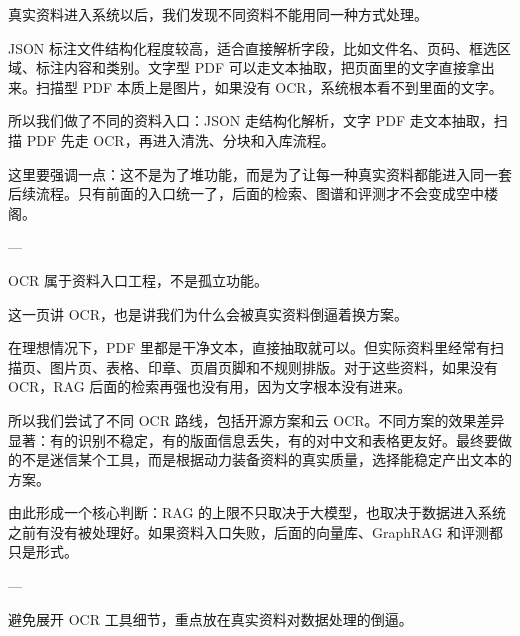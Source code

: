 \documentclass[10pt, a4paper]{ctexart}
\begin{document}
\begin{tcolorbox}[colback=white, colframe=primary!35, title={\textbf{第 7 页：不同资料必须走不同通道}}, beforeafter skip=2.0pt]
\begin{minipage}[t]{0.72\textwidth}
  \linespread{1.0}\selectfont\footnotesize
  真实资料进入系统以后，我们发现不同资料不能用同一种方式处理。

JSON 标注文件结构化程度较高，适合直接解析字段，比如文件名、页码、框选区域、标注内容和类别。文字型 PDF 可以走文本抽取，把页面里的文字直接拿出来。扫描型 PDF 本质上是图片，如果没有 OCR，系统根本看不到里面的文字。

所以我们做了不同的资料入口：JSON 走结构化解析，文字 PDF 走文本抽取，扫描 PDF 先走 OCR，再进入清洗、分块和入库流程。

这里要强调一点：这不是为了堆功能，而是为了让每一种真实资料都能进入同一套后续流程。只有前面的入口统一了，后面的检索、图谱和评测才不会变成空中楼阁。

---
\end{minipage}
\hfill
\begin{minipage}[t]{0.25\textwidth}
  \fontsize{7.5}{9.5}\selectfont
  \begin{tcolorbox}[colback=orange!5, colframe=orange!45, title=\textbf{讲述重点}, left=0.6mm, right=0.6mm, top=0.8mm, bottom=0.8mm, arc=0.8mm, boxrule=0.4pt, beforeafter skip=0pt]
    OCR 属于资料入口工程，不是孤立功能。
  \end{tcolorbox}
\end{minipage}
\end{tcolorbox}

\begin{tcolorbox}[colback=white, colframe=primary!35, title={\textbf{第 8 页：真实资料没有那么干净}}, beforeafter skip=2.0pt]
\begin{minipage}[t]{0.72\textwidth}
  \linespread{1.0}\selectfont\footnotesize
  这一页讲 OCR，也是讲我们为什么会被真实资料倒逼着换方案。

在理想情况下，PDF 里都是干净文本，直接抽取就可以。但实际资料里经常有扫描页、图片页、表格、印章、页眉页脚和不规则排版。对于这些资料，如果没有 OCR，RAG 后面的检索再强也没有用，因为文字根本没有进来。

所以我们尝试了不同 OCR 路线，包括开源方案和云 OCR。不同方案的效果差异显著：有的识别不稳定，有的版面信息丢失，有的对中文和表格更友好。最终要做的不是迷信某个工具，而是根据动力装备资料的真实质量，选择能稳定产出文本的方案。

由此形成一个核心判断：RAG 的上限不只取决于大模型，也取决于数据进入系统之前有没有被处理好。如果资料入口失败，后面的向量库、GraphRAG 和评测都只是形式。

---
\end{minipage}
\hfill
\begin{minipage}[t]{0.25\textwidth}
  \fontsize{7.5}{9.5}\selectfont
  \begin{tcolorbox}[colback=orange!5, colframe=orange!45, title=\textbf{讲述重点}, left=0.6mm, right=0.6mm, top=0.8mm, bottom=0.8mm, arc=0.8mm, boxrule=0.4pt, beforeafter skip=0pt]
    避免展开 OCR 工具细节，重点放在真实资料对数据处理的倒逼。
  \end{tcolorbox}
\end{minipage}
\end{tcolorbox}
\end{document}
